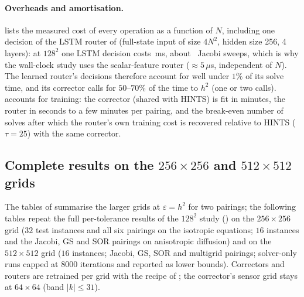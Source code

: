 \paragraph{Overheads and amortisation.}  lists the measured cost of every operation as a function of $N$, including one decision of the LSTM router of  (full-state input of size $4N^2$, hidden size 256, 4 layers): at $128^2$ one LSTM decision costs \caLstmMs\,ms, about \caLstmOverJacobi\ Jacobi sweeps, which is why the wall-clock study uses the scalar-feature router ($\approx 5\,\mu$s, independent of $N$). The learned router's decisions therefore account for well under $1\%$ of its solve time, and its corrector calls for $50$--$70\%$ of the time to $h^2$ (one or two calls).  accounts for training: the corrector (shared with HINTS) is fit in minutes, the router in seconds to a few minutes per pairing, and the break-even number of solves after which the router's own training cost is recovered relative to HINTS ($\tau{=}25$) with the same corrector.

\begin{table}[H]
\color{red}
\centering
\caption{Measured single-thread cost of one operation as a function of the grid size (Poisson; median of repeated calls). Multigrid uses a direct solve below $64^2$ and is not listed there.}
\resizebox{\textwidth}{!}{\caoverheads}
\label{tab:ca_overheads}
\end{table}

\begin{table}[H]
\color{red}
\centering
\caption{Training-cost amortisation for the GS pairing: corrector training (data generation and least-squares fit, CPU), router training (oracle rollouts and two DAgger rounds), median wall-clock saved per solve at $\varepsilon = h^2$ relative to HINTS ($\tau{=}25$) and to the solver alone, and the number of solves after which the router's training cost is recovered relative to HINTS.}
\resizebox{\textwidth}{!}{\caamort}
\label{tab:ca_amort}
\end{table}

\subsection{Complete results on the $256\times256$ and $512\times512$ grids}
\label{sec:wallclock_large}

The tables of  summarise the larger grids at $\varepsilon = h^2$ for two pairings; the following tables repeat the full per-tolerance results of the $128^2$ study () on the $256\times 256$ grid ($32$ test instances and all six pairings on the isotropic equations; $16$ instances and the Jacobi, GS and SOR pairings on anisotropic diffusion) and on the $512\times 512$ grid ($16$ instances; Jacobi, GS, SOR and multigrid pairings; solver-only runs capped at $8000$ iterations and reported as lower bounds). Correctors and routers are retrained per grid with the recipe of ; the corrector's sensor grid stays at $64\times 64$ (band $|k|\le 31$).

